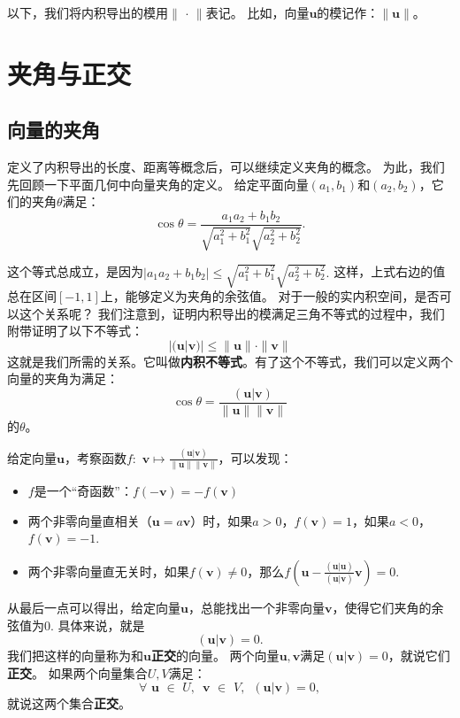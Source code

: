 \documentclass[12pt,UTF8]{ctexbook}
\begin{document}
以下，我们将内积导出的模用$\|\,\cdot\,\|$表记。
比如，向量$\mathbf{u}$的模记作：$\|\mathbf{u}\|$。

\section{夹角与正交}
\subsection{向量的夹角}
定义了内积导出的长度、距离等概念后，可以继续定义夹角的概念。
为此，我们先回顾一下平面几何中向量夹角的定义。
给定平面向量$(a_1, b_1)$和$(a_2, b_2)$，它们的夹角$\theta$满足：
$$ \cos \theta = \frac{a_1a_2 + b_1b_2}{\sqrt{a_1^2 + b_1^2}\sqrt{a_2^2 + b_2^2}}. $$

这个等式总成立，是因为$|a_1a_2 + b_1b_2| \leqslant \sqrt{a_1^2 + b_1^2}\sqrt{a_2^2 + b_2^2}.$ 
这样，上式右边的值总在区间$[-1,1]$上，能够定义为夹角的余弦值。
对于一般的实内积空间，是否可以这个关系呢？
我们注意到，证明内积导出的模满足三角不等式的过程中，我们附带证明了以下不等式：
$$ |(\mathbf{u} | \mathbf{v})| \leqslant \|\mathbf{u}\| \cdot \|\mathbf{v}\|$$
这就是我们所需的关系。它叫做\textbf{内积不等式}。有了这个不等式，我们可以定义两个向量的夹角为满足：
$$ \cos \theta = \frac{(\mathbf{u} | \mathbf{v})}{\|\mathbf{u}\|  \|\mathbf{v}\|} $$
的$\theta$。

给定向量$\mathbf{u}$，考察函数$ f: \,\, \mathbf{v} \mapsto \frac{(\mathbf{u} | \mathbf{v})}{\|\mathbf{u}\|  \|\mathbf{v}\|}$，可以发现：
\begin{itemize}
    \item $f$是一个“奇函数”：$f( -\mathbf{v}) = -f(\mathbf{v})$
    \item 两个非零向量直相关（$\mathbf{u} = a\mathbf{v}$）时，如果$a>0$，$f(\mathbf{v}) = 1$，如果$a<0$，$f(\mathbf{v}) = -1.$
    \item 两个非零向量直无关时，如果$f(\mathbf{v}) \neq 0$，那么$f\left(\mathbf{u}-\frac{(\mathbf{u} | \mathbf{u})}{(\mathbf{u} | \mathbf{v})}\mathbf{v}\right) = 0.$
\end{itemize}
从最后一点可以得出，给定向量$\mathbf{u}$，总能找出一个非零向量$\mathbf{v}$，使得它们夹角的余弦值为0. 具体来说，就是
$$ (\mathbf{u} | \mathbf{v}) = 0.$$
我们把这样的向量称为和$\mathbf{u}$\textbf{正交}的向量。
两个向量$\mathbf{u}, \mathbf{v}$满足$(\mathbf{u} | \mathbf{v}) = 0$，就说它们\textbf{正交}。
如果两个向量集合$U, V$满足：
$$ \forall \,\, \mathbf{u} \,\, \in \,\, U, \, \,\, \mathbf{v} \,\, \in \,\, V, \,\,\, (\mathbf{u} | \mathbf{v}) = 0,$$
就说这两个集合\textbf{正交}。
\end{document}
